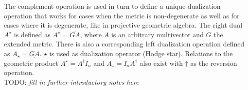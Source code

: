 The complement operation is used in turn to define a unique dualization operation that
works for cases when the metric is non-degenerate as well as for cases where it is
degenerate, like in projective geometric algebra. The right dual $A^{\star}$ is defined as
$A^{\star} = \overline{GA}$, where $A$ is an arbitrary multivector and $G$ the extended
metric. There is also a corresponding left dualization operation defined as $A_{\star} =
\underline{GA}$. $\star$ is used as dualization operator (Hodge star). Relations to the
geometric product $A^{\star} = A^{\dagger} I_n$ and $A_{\star} = I_n A^{\dagger}$ also
exist with $\dagger$ as the reversion operation. \\


TODO: \emph{fill in further introductory notes here}

\newpage
